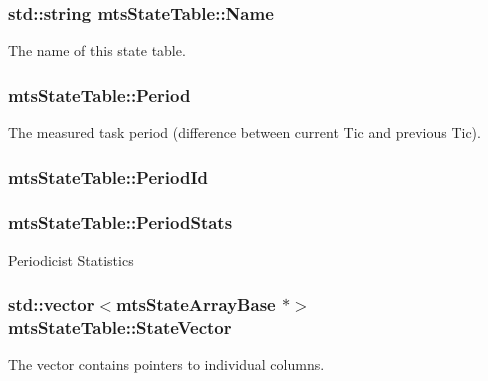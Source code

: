 \subsubsection[{Name}]{\setlength{\rightskip}{0pt plus 5cm}std\+::string mts\+State\+Table\+::\+Name\hspace{0.3cm}{\ttfamily [protected]}}\label{classmts_state_table_ad526708a4622c8cc4d9398bdb6b9ad5e}
The name of this state table. \hypertarget{classmts_state_table_a4b11db6f64680d32fa7a0fc79ee62862}{}
\subsubsection[{Period}]{ mts\+State\+Table\+::\+Period}\label{classmts_state_table_a4b11db6f64680d32fa7a0fc79ee62862}
The measured task period (difference between current Tic and previous Tic). \hypertarget{classmts_state_table_a1035a10fa91b94e61061abbd049d9eb6}{}
\subsubsection[{Period\+Id}]{ mts\+State\+Table\+::\+Period\+Id\hspace{0.3cm}{\ttfamily [protected]}}\label{classmts_state_table_a1035a10fa91b94e61061abbd049d9eb6}
\hypertarget{classmts_state_table_ae4914598ee6ee5a523f8ecc7008c5ceb}{}
\subsubsection[{Period\+Stats}]{ mts\+State\+Table\+::\+Period\+Stats}\label{classmts_state_table_ae4914598ee6ee5a523f8ecc7008c5ceb}
Periodicist Statistics \hypertarget{classmts_state_table_a744da952e79c0336d4208a841ae35aae}{}
\subsubsection[{State\+Vector}]{\setlength{\rightskip}{0pt plus 5cm}std\+::vector$<${\bf mts\+State\+Array\+Base} $\ast$$>$ mts\+State\+Table\+::\+State\+Vector\hspace{0.3cm}{\ttfamily [protected]}}\label{classmts_state_table_a744da952e79c0336d4208a841ae35aae}
The vector contains pointers to individual columns. \hypertarget{classmts_state_table_a5eb62dbdd241d316b7a18ef22f68ae91}{}
